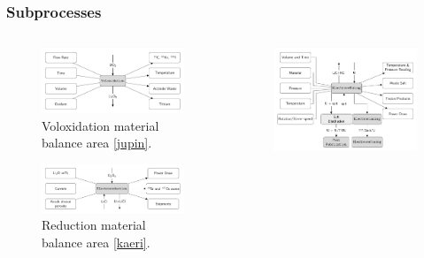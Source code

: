 \begin{frame}
\frametitle{Subprocesses}
\begin{columns}
	\begin{column}{.5\textwidth}
		\begin{figure} 
			\centering
			\includegraphics[width=0.9\linewidth]{volox}
			\caption{Voloxidation material balance area \ref{jupin}.}
			\label{fig:volox}
		\end{figure}
		\begin{figure} 
			\centering
			\includegraphics[width=0.9\linewidth]{reduction}
			\caption{Reduction material balance area \ref{kaeri}.}
			\label{fig:reduction}
		\end{figure}
	\end{column}
	\begin{column}{.5\textwidth}
		\begin{figure}
			\centering
			\includegraphics[width=0.9\linewidth]{refining}

\end{figure}
\end{column}
\end{columns}
\end{frame}
